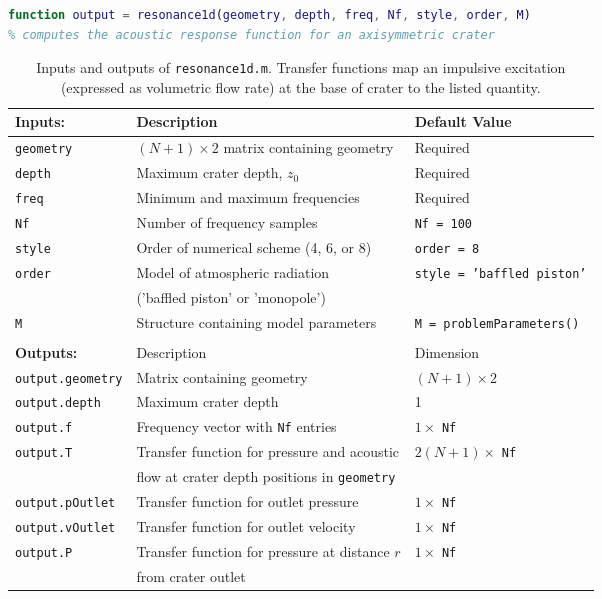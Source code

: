 \documentclass[10pt]{article}
\begin{document}
\begin{lstlisting}[language=Matlab]
function output = resonance1d(geometry, depth, freq, Nf, style, order, M)
% computes the acoustic response function for an axisymmetric crater
\end{lstlisting}

\begin{table}[h!]
\begin{tabular}{l | ll }
{\bf Inputs:} & Description & Default Value\\ \hline
  \texttt{geometry} & $(N+1) \times 2$ matrix containing geometry & Required \\
  \texttt{depth} & Maximum crater depth, $z_0$ & Required \\
  \texttt{freq} & Minimum and maximum frequencies & Required \\
  \texttt{Nf} & Number of frequency samples & \texttt{Nf = 100} \\
  \texttt{style} & Order of numerical scheme (4, 6, or 8) & \texttt{order = 8} \\
  \texttt{order} & Model of atmospheric radiation & \texttt{style = 'baffled piston'} \\
  & ('baffled piston' or 'monopole') & \\
  \texttt{M} & Structure containing model parameters & \texttt{M = problemParameters()} \\
  \hline 
  \\[-0.2cm]
  {\bf Outputs:} & Description & Dimension \\ \hline
  \texttt{output.geometry} & Matrix containing geometry & $(N+1) \times 2$ \\
  \texttt{output.depth} & Maximum crater depth & 1\\
  \texttt{output.f} & Frequency vector with \texttt{Nf} entries & $1 \times$ \texttt{Nf}\\
  \texttt{output.T} & Transfer function for pressure and acoustic & $2(N+1) \times$ \texttt{Nf} \\
  & flow at crater depth positions in \texttt{geometry} & \\
  \texttt{output.pOutlet} &  Transfer function for outlet pressure& $1 \times$ \texttt{Nf} \\
  \texttt{output.vOutlet} & Transfer function for outlet velocity & $1 \times$ \texttt{Nf} \\
  \texttt{output.P} & Transfer function for pressure at distance $r$ & $1 \times$ \texttt{Nf} \\
  & from crater outlet& \\
\end{tabular}
\caption{Inputs and outputs of \texttt{resonance1d.m}. Transfer functions map an impulsive excitation (expressed as volumetric flow rate) at the base of crater to the listed quantity.}
\end{table}
\end{document}
